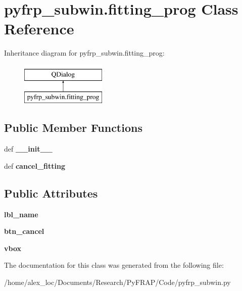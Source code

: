 \hypertarget{classpyfrp__subwin_1_1fitting__prog}{\section{pyfrp\+\_\+subwin.\+fitting\+\_\+prog Class Reference}
\label{classpyfrp__subwin_1_1fitting__prog}
}
Inheritance diagram for pyfrp\+\_\+subwin.\+fitting\+\_\+prog\+:\begin{figure}[H]
\begin{center}
\leavevmode
\includegraphics[height=2.000000cm]{classpyfrp__subwin_1_1fitting__prog}
\end{center}
\end{figure}
\subsection*{Public Member Functions}
\begin{DoxyCompactItemize}
\item 
\hypertarget{classpyfrp__subwin_1_1fitting__prog_a14db48e215f6b32d258dda95cb55c0ce}{def {\bfseries \+\_\+\+\_\+init\+\_\+\+\_\+}}\label{classpyfrp__subwin_1_1fitting__prog_a14db48e215f6b32d258dda95cb55c0ce}

\item 
\hypertarget{classpyfrp__subwin_1_1fitting__prog_ac2b67fc4dec25d9f1acbaa6fe995a615}{def {\bfseries cancel\+\_\+fitting}}\label{classpyfrp__subwin_1_1fitting__prog_ac2b67fc4dec25d9f1acbaa6fe995a615}

\end{DoxyCompactItemize}
\subsection*{Public Attributes}
\begin{DoxyCompactItemize}
\item 
\hypertarget{classpyfrp__subwin_1_1fitting__prog_a5108e8d8cfec0951c71267903895f85e}{{\bfseries lbl\+\_\+name}}\label{classpyfrp__subwin_1_1fitting__prog_a5108e8d8cfec0951c71267903895f85e}

\item 
\hypertarget{classpyfrp__subwin_1_1fitting__prog_a09b0b70b71286e0743cfd17338299c8a}{{\bfseries btn\+\_\+cancel}}\label{classpyfrp__subwin_1_1fitting__prog_a09b0b70b71286e0743cfd17338299c8a}

\item 
\hypertarget{classpyfrp__subwin_1_1fitting__prog_a7ede5c97fd9ab41eb756e3d869fabdef}{{\bfseries vbox}}\label{classpyfrp__subwin_1_1fitting__prog_a7ede5c97fd9ab41eb756e3d869fabdef}

\end{DoxyCompactItemize}


The documentation for this class was generated from the following file\+:\begin{DoxyCompactItemize}
\item 
/home/alex\+\_\+loc/\+Documents/\+Research/\+Py\+F\+R\+A\+P/\+Code/pyfrp\+\_\+subwin.\+py\end{DoxyCompactItemize}
